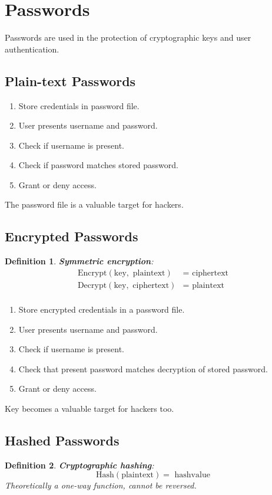 \documentclass[11pt]{article}
\newtheorem{defn}{Definition}
\begin{document}
\section{Passwords}
Passwords are used in the protection of cryptographic keys and user authentication.

\subsection{Plain-text Passwords}
\begin{enumerate}
  \item Store credentials in password file.
  \item User presents username and password.
  \item Check if username is present.
  \item Check if password matches stored password.
  \item Grant or deny access.
\end{enumerate}

The password file is a valuable target for hackers.

\subsection{Encrypted Passwords}
\begin{defn}
  \textbf{Symmetric encryption}:
  \begin{align*}
    \text{Encrypt}(\text{key}, \text{ plaintext}) &= \text{ ciphertext} \\
    \text{Decrypt}(\text{key}, \text{ ciphertext}) &= \text{ plaintext} \\
  \end{align*}
\end{defn}

\begin{enumerate}
  \item Store encrypted credentials in a password file.
  \item User presents username and password.
  \item Check if username is present.
  \item Check that present password matches decryption of stored password.
  \item Grant or deny access.
\end{enumerate}

Key becomes a valuable target for hackers too.

\subsection{Hashed Passwords}
\begin{defn}
  \textbf{Cryptographic hashing}:
  \[
    \text{Hash}(\text{plaintext}) = \text{ hashvalue} 
  \]
  Theoretically a one-way function, cannot be reversed.
\end{defn}
\end{document}
